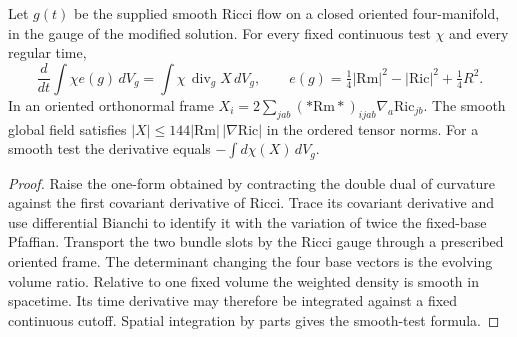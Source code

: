 \begin{theorem}
\label{thm:ed03-tested-euler}
\leanok
Let $g(t)$ be the supplied smooth Ricci flow on a closed oriented
four-manifold, in the gauge of the modified solution. For every fixed
continuous test $\chi$ and every regular time,
\[
 \frac{d}{dt}\int\chi e(g)\,dV_g=\int\chi\,\operatorname{div}_g X\,dV_g,
 \qquad e(g)=\tfrac14|\mathrm{Rm}|^2-|\mathrm{Ric}|^2+\tfrac14R^2.
\]
In an oriented orthonormal frame $X_i=2\sum_{jab}
({*}\mathrm{Rm}{*})_{ijab}\nabla_a\mathrm{Ric}_{jb}$. The smooth global
field satisfies $|X|\le144|\mathrm{Rm}|\,|\nabla\mathrm{Ric}|$ in the
ordered tensor norms. For a smooth test the derivative equals
$-\int d\chi(X)\,dV_g$.
\end{theorem}
\begin{proof}
\leanok
Raise the one-form obtained by contracting the double dual of curvature
against the first covariant derivative of Ricci. Trace its covariant
derivative and use differential Bianchi to identify it with the variation
of twice the fixed-base Pfaffian. Transport the two bundle slots by the
Ricci gauge through a prescribed oriented frame. The determinant changing
the four base vectors is the evolving volume ratio. Relative to one fixed
volume the weighted density is smooth in spacetime. Its time derivative
may therefore be integrated against a fixed continuous cutoff. Spatial
integration by parts gives the smooth-test formula.
\end{proof}

